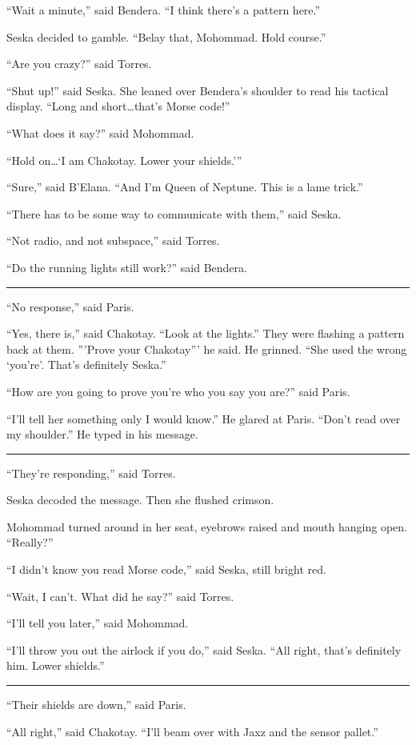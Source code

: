 \documentclass[twoside,letterpaper,12pt]{memoir}
\begin{document}
``Wait a minute,'' said Bendera. ``I think there’s a pattern here.''

Seska decided to gamble. ``Belay that, Mohommad. Hold course.''

``Are you crazy?'' said Torres.

``Shut up!'' said Seska. She leaned over Bendera’s shoulder to read his tactical display. ``Long and short\ldots that's Morse code!''

``What does it say?'' said Mohommad.

``Hold on\ldots `I am Chakotay. Lower your shields.'''

``Sure,'' said B'Elana. ``And I'm Queen of Neptune. This is a lame trick.''

``There has to be some way to communicate with them,'' said Seska.

``Not radio, and not subspace,'' said Torres.

``Do the running lights still work?'' said Bendera.

\fancybreak{\rule{3cm}{0.4 pt}}
``No response,'' said Paris.

``Yes, there is,'' said Chakotay. ``Look at the lights.'' They were flashing a pattern back at them. '''Prove your Chakotay''' he said. He grinned. ``She used the wrong `you're'. That's definitely Seska.''

``How are you going to prove you're who you say you are?'' said Paris.

``I'll tell her something only I would know.'' He glared at Paris. ``Don't read over my shoulder.'' He typed in his message.

\fancybreak{\rule{3cm}{0.4 pt}}
``They're responding,'' said Torres.

Seska decoded the message. Then she flushed crimson.

Mohommad turned around in her seat, eyebrows raised and mouth hanging open. ``Really?''

``I didn't know you read Morse code,'' said Seska, still bright red.

``Wait, I can't. What did he say?'' said Torres.

``I'll tell you later,'' said Mohommad.

``I'll throw you out the airlock if you do,'' said Seska. ``All right, that’s definitely him. Lower shields.''

\fancybreak{\rule{3cm}{0.4 pt}}
``Their shields are down,'' said Paris.

``All right,'' said Chakotay. ``I'll beam over with Jaxz and the sensor pallet.''
\end{document}
